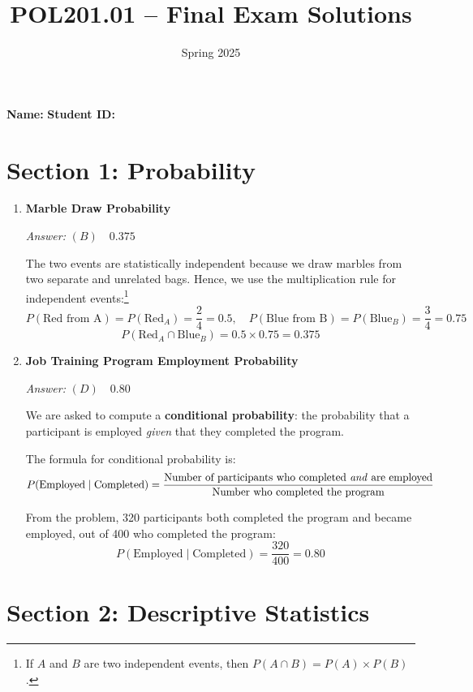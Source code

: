 \documentclass[12pt]{article}
\title{POL201.01 -- Final Exam Solutions}
\author{Spring 2025}
\date{}
\begin{document}
\maketitle
\noindent\textbf{Name:} \underline{\hspace{8cm}} \hfill \textbf{Student ID:} \underline{\hspace{4cm}}

\section*{Section 1: Probability}

\begin{enumerate}[label=1.\arabic*]
    \item \textbf{Marble Draw Probability}

    \textit{Answer:}   $\boxed{(B)\quad0.375}$

    The two events are statistically independent because we draw marbles from two separate and unrelated bags. Hence, we use the multiplication rule for independent events:\footnote{If $A$ and $B$ are two independent events, then $P(A\cap B)=P(A)\times P(B)$.}
\[
    P(\text{Red from A}) = P(\text{Red}_A) = \frac{2}{4} = 0.5,\quad P(\text{Blue from B}) = P(\text{Blue}_B)  = \frac{3}{4} = 0.75
\]
\[
    P(\text{Red}_A \cap \text{Blue}_B) = 0.5 \times 0.75 = \boxed{0.375}
\]

    \item \textbf{Job Training Program Employment Probability}

    \textit{Answer:}  $\boxed{(D)\quad0.80}$

    We are asked to compute a \textbf{conditional probability}: the probability that a participant is employed \emph{given} that they completed the program.

    The formula for conditional probability is:
    \[
        P(\text{Employed} \mid \text{Completed}) = \frac{\text{Number of participants who completed \emph{and} are employed}}{\text{Number who completed the program}}
    \]

    From the problem, 320 participants both completed the program and became employed, out of 400 who completed the program:
    \[
        P(\text{Employed} \mid \text{Completed}) = \frac{320}{400} = \boxed{0.80}
    \]


\end{enumerate}

\section*{Section 2: Descriptive Statistics}
\end{document}
